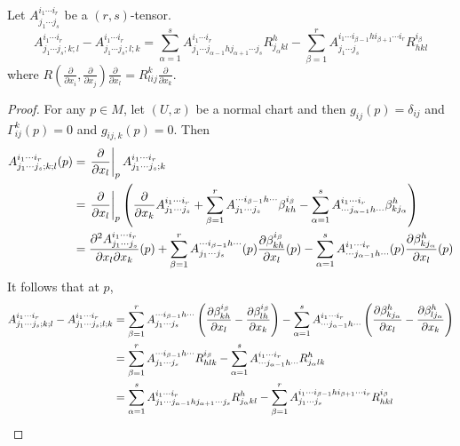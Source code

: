 \begin{thm}
	Let $A^{i_1 \cdots i_r}_{j_1 \cdots j_s}$ be a $(r,s)$-tensor.
	\begin{equation*}
		A^{i_1 \cdots i_r}_{j_1 \cdots j_s;k;l} - A^{i_1 \cdots i_r}_{j_1 \cdots j_s;l;k} = \sum_{\alpha=1}^s A^{i_1 \cdots i_r}_{j_1 \cdots j_{\alpha-1}h j_{\alpha+1} \cdots j_s}R^h_{j_\alpha kl} - \sum_{\beta=1}^rA^{i_1 \cdots i_{\beta-1} h i_{\beta+1} \cdots i_r}_{j_1 \cdots j_s}R^{i_\beta}_{hkl}
	\end{equation*}
	where $R(\frac{\partial}{\partial x_i},\frac{\partial}{\partial x_j})\frac{\partial}{\partial x_l} = R^k_{lij}\frac{\partial}{\partial x_k}$.
\end{thm}
\begin{proof}
	For any $p \in M$, let $(U,x)$ be a normal chart and then $g_{ij}(p) = \delta_{ij}$ and $\Gamma^k_{ij}(p) = 0$ and $g_{ij,k}(p) = 0$. Then
	\begin{equation*}
		\begin{aligned}
			A^{i_1 \cdots i_r}_{j_1 \cdots j_s;k;l}(p) &= \left.\frac{\partial}{\partial x_l}\right\lvert_pA^{i_1 \cdots i_r}_{j_1 \cdots j_s;k} \\
			&=\left.\frac{\partial}{\partial x_l}\right\lvert_p \left(\frac{\partial}{\partial x_{k}}A^{i_1 \cdots i_r}_{j_1 \cdots j_s} + \sum_{\beta=1}^r A^{\cdots i_{\beta-1} h\cdots}_{j_1 \cdots j_s}\beta^{i_\beta}_{kh}-\sum_{\alpha=1}^sA^{i_1 \cdots i_r}_{\cdots j_{\alpha-1}h \cdots}\beta^h_{kj_\alpha}\right) \\
			&= \frac{\partial^2 A^{i_1 \cdots i_r}_{j_1 \cdots j_s}}{\partial x_{l}\partial x_{k}}(p) + \sum_{\beta=1}^r A^{\cdots i_{\beta-1} h\cdots}_{j_1 \cdots j_s}(p)\frac{\partial \beta^{i_\beta}_{kh}}{\partial x_l}(p)-\sum_{\alpha=1}^sA^{i_1 \cdots i_r}_{\cdots j_{\alpha-1}h \cdots}(p)\frac{\partial \beta^h_{kj_\alpha}}{\partial x_l}(p)
		\end{aligned}
	\end{equation*}
	It follows that at $p$,
	\begin{equation*}
		\begin{aligned}
			A^{i_1 \cdots i_r}_{j_1 \cdots j_s;k;l} -A^{i_1 \cdots i_r}_{j_1 \cdots j_s;l;k} &= \sum_{\beta=1}^r A^{\cdots i_{\beta-1} h\cdots}_{j_1 \cdots j_s}\left(\frac{\partial \beta^{i_\beta}_{kh}}{\partial x_l} - \frac{\partial \beta^{i_\beta}_{lh}}{\partial x_k}\right)-\sum_{\alpha=1}^sA^{i_1 \cdots i_r}_{\cdots j_{\alpha-1}h \cdots}\left(\frac{\partial \beta^h_{kj_\alpha}}{\partial x_l} - \frac{\partial \beta^h_{lj_\alpha}}{\partial x_k}\right) \\ 
			&= \sum_{\beta=1}^r A^{\cdots i_{\beta-1} h\cdots}_{j_1 \cdots j_s}R^{i_\beta}_{hlk}-\sum_{\alpha=1}^sA^{i_1 \cdots i_r}_{\cdots j_{\alpha-1}h \cdots}R^h_{j_\alpha lk} \\
			&= \sum_{\alpha=1}^s A^{i_1 \cdots i_r}_{j_1 \cdots j_{\alpha-1}h j_{\alpha+1} \cdots j_s}R^h_{j_\alpha kl} - \sum_{\beta=1}^rA^{i_1 \cdots i_{\beta-1} h i_{\beta+1} \cdots i_r}_{j_1 \cdots j_s}R^{i_\beta}_{hkl}
		\end{aligned}
	\end{equation*}
\end{proof}
